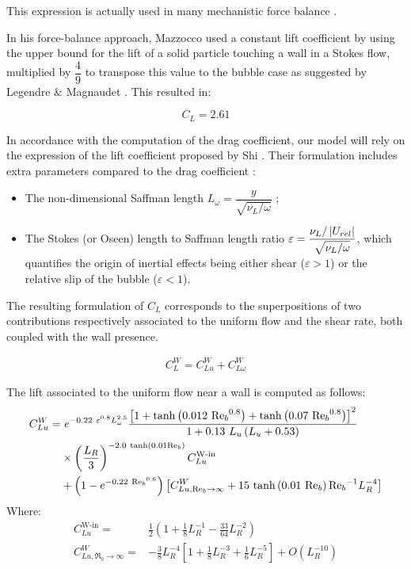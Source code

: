 This expression is actually used in many mechanistic force balance \cite{klausner_vapor_1993, chen_prediction_2012, sugrue_modified_2016, ren_development_2020}.


\npar

In his force-balance approach, Mazzocco \etal \cite{mazzocco_reassessed_2018} used a constant lift coefficient by using the upper bound for the lift of a solid particle touching a wall in a Stokes flow, multiplied by $\dfrac{4}{9}$ to transpose this value to the bubble case as suggested by Legendre \& Magnaudet \cite{legendre_lift_1998}. This resulted in:

\begin{equation}
C_{L} = 2.61
\end{equation}


\npar

In accordance with the computation of the drag coefficient, our model will rely on the expression of the lift coefficient proposed by Shi \etal \cite{shi_drag_2021}. Their formulation includes extra parameters compared to the drag coefficient :
\begin{itemize}
\item The non-dimensional Saffman length $L_{\omega} = \dfrac{y}{\sqrt{\nu_{L} / \omega}}$ ;
\item The Stokes (or Oseen) length to Saffman length ratio $\varepsilon = \dfrac{\nu_{L} / \left| U_{rel} \right|}{\sqrt{\nu_{L} / \omega}}$, which quantifies the origin of inertial effects being either shear ($\varepsilon >1$) or the relative slip of the bubble ($\varepsilon < 1$).

\end{itemize}  

The resulting formulation of $C_{L}$ corresponds to the superpositions of two contributions respectively associated to the uniform flow and the shear rate, both coupled with the wall presence. 

\begin{align}
C_{L}^{W} =C_{Lu}^{W} + C_{L\omega}^{W}
\label{eq:lift_shi}
\end{align}



The lift associated to the uniform flow near a wall is computed as follows:
\begin{align}
\nonumber C_{Lu}^{W} =&\  e^{-0.22\ \varepsilon^{0.8}L_{\omega}^{2.5}} \frac{ \crocht{1 + \tanh{0.012\ {\Re_{b}}^{0.8}} + \tanh{0.07\ {\Re_{b}}^{0.8}} }^{2} } {1+0.13\ L_{u} \parth{L_{u}+0.53} } \\
%
\nonumber			&\times  \parth{\frac{L_{R}}{3}}^{-2.0\ \tanh{0.01\Re_{b}}}  C_{Lu}^{\text{W-in}}\\
%
&+\parth{1-e^{-0.22\ {\Re_{b}}^{0.6}} } \crocht{ C_{Lu,\Re_{b}\to \infty}^{W} + 15\ \tanh{ 0.01\ \Re_{b} }{\Re_{b}}^{-1} L_{R}^{-4} }
%
\end{align}
Where:
\begin{align}
C_{Lu}^{\text{W-in}}=&\frac{1}{2}\left(1+\frac{1}{8}L_{R}^{-1}-\frac{33}{64}L_{R}^{-2}\right)\\
%
C_{Lu, \Re_{b} \to \infty}^{W} = & -\frac{3}{8}L_{R}^{-4}\left[1+\frac{1}{8}L_{R}^{-3}+\frac{1}{6}L_{R}^{-5}\right] + O\left(L_{R}^{-10}\right)
\end{align}


